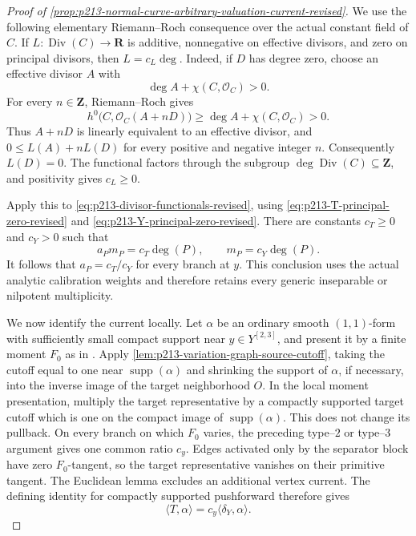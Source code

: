 \begin{proof}[Proof of
\cref{prop:p213-normal-curve-arbitrary-valuation-current-revised}]
We use the following elementary Riemann--Roch consequence over the actual
constant field of $C$.  If
$L:\operatorname{Div}(C)\to\mathbf R$ is additive, nonnegative on
effective divisors, and zero on principal divisors, then $L=c_L\deg$.
Indeed, if $D$ has degree zero, choose an effective divisor $A$ with
\begin{equation}
                  \deg A+\chi(C,\mathcal O_C)>0.
\label{eq:p213-rr-positive-constant-revised}
\end{equation}
For every $n\in\mathbf Z$, Riemann--Roch gives
\[
 h^0\bigl(C,\mathcal O_C(A+nD)\bigr)
    \geq \deg A+\chi(C,\mathcal O_C)>0.
\]
Thus $A+nD$ is linearly equivalent to an effective divisor, and
$0\leq L(A)+nL(D)$ for every positive and negative integer $n$.
Consequently $L(D)=0$.  The functional factors through the subgroup
$\deg\operatorname{Div}(C)\subseteq\mathbf Z$, and positivity gives
$c_L\geq0$.

Apply this to \eqref{eq:p213-divisor-functionals-revised}, using
\eqref{eq:p213-T-principal-zero-revised} and
\eqref{eq:p213-Y-principal-zero-revised}.  There are constants
$c_T\geq0$ and $c_Y>0$ such that
\[
                  a_Pm_P=c_T\deg(P),
                  \qquad m_P=c_Y\deg(P).
\]
It follows that $a_P=c_T/c_Y$ for every branch at $y$.  This conclusion
uses the actual analytic calibration weights and therefore retains every
generic inseparable or nilpotent multiplicity.

We now identify the current locally.  Let $\alpha$ be an ordinary smooth
$(1,1)$-form with sufficiently small compact support near
$y\in Y^{[2,3]}$, and present it by a finite moment $F_0$ as in
\cite[Proposition~15.1.1(b)]{CLD25}.  Apply
\cref{lem:p213-variation-graph-source-cutoff}, taking the cutoff equal to
one near $\operatorname{supp}(\alpha)$ and shrinking the support of
$\alpha$, if necessary, into the inverse image of the target neighborhood
$O$.  In the local moment presentation, multiply the target representative
by a compactly supported target cutoff which is one on the compact image
of $\operatorname{supp}(\alpha)$.  This does not change its pullback.
On every branch on which $F_0$ varies, the preceding type--$2$ or
type--$3$ argument gives one common ratio $c_y$.  Edges activated only by
the separator block have zero $F_0$-tangent, so the target representative
vanishes on their primitive tangent.  The Euclidean lemma excludes an
additional vertex current.  The defining identity for compactly supported
pushforward therefore gives
\begin{equation}
                         \langle T,\alpha\rangle
                    =c_y\langle\delta_Y,\alpha\rangle.
\label{eq:p213-local-current-equality-revised}
\end{equation}


\end{proof}
